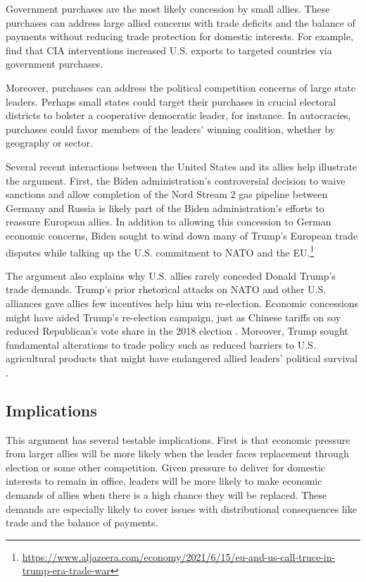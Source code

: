 \documentclass[12pt]{article}
\begin{document}
Government purchases are the most likely concession by small allies. 
These purchases can address large allied concerns with trade deficits and the balance of payments without reducing trade protection for domestic interests. 
For example, \citep{Bergeretal2013} find that CIA interventions increased U.S. exports to targeted countries via government purchases.


Moreover, purchases can address the political competition concerns of large state leaders.
Perhaps small states could target their purchases in crucial electoral districts to bolster a cooperative democratic leader, for instance. 
In autocracies, purchases could favor members of the leaders' winning coalition, whether by geography or sector.


Several recent interactions between the United States and its allies help illustrate the argument. 
First, the Biden administration's controversial decision to waive sanctions and allow completion of the Nord Stream 2 gas pipeline between Germany and Russia is likely part of the Biden administration's efforts to reassure European allies. 
In addition to allowing this concession to German economic concerns, Biden sought to wind down many of Trump's European trade disputes while talking up the U.S. commitment to NATO and the EU.\footnote{\url{https://www.aljazeera.com/economy/2021/6/15/eu-and-us-call-truce-in-trump-era-trade-war}}


The argument also explains why U.S. allies rarely conceded Donald Trump's trade demands. 
Trump's prior rhetorical attacks on NATO and other U.S. alliances gave allies few incentives help him win re-election. 
Economic concessions might have aided Trump's re-election campaign, just as Chinese tariffs on soy reduced Republican's vote share in the 2018 election \citep{ChyzhUrbatsch2021}. 
Moreover, Trump sought fundamental alterations to trade policy such as reduced barriers to U.S. agricultural products that might have endangered allied leaders' political survival \citep{HeeParkJensen2007}.


\subsection{Implications}

This argument has several testable implications. 
First is that economic pressure from larger allies will be more likely when the leader faces replacement through election or some other competition. 
Given pressure to deliver for domestic interests to remain in office, leaders will be more likely to make economic demands of allies when there is a high chance they will be replaced. 
These demands are especially likely to cover issues with distributional consequences like trade and the balance of payments.
\end{document}
